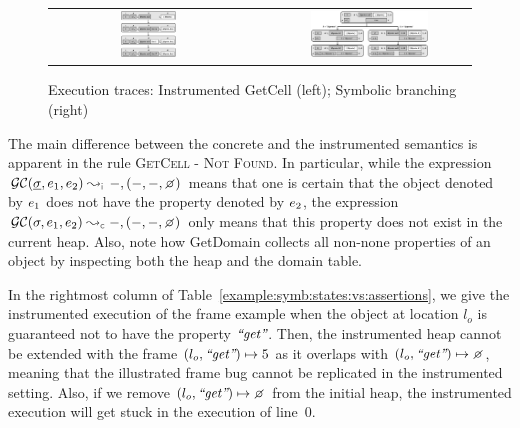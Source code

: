  
\setcounter{figure}{4}   
\begin{figure}[!t]
\centering
\begin{tabular}{c||c}
\includegraphics[width=0.28\textwidth]{figures/domaintable.png} \ & \ \includegraphics[width=0.59\textwidth]{figures/symbSemEx.png}
\end{tabular}
\vspace*{-0.3cm}
\caption{Execution traces: Instrumented GetCell (left); Symbolic branching (right)}
\label{fig:sexecexample}
\vspace*{-0.4cm}
\end{figure}

\smallskip
 The main difference between the concrete and the instrumented semantics is apparent in the rule \textsc{GetCell - Not Found}. 
In particular, while the expression $\absgetcellrule{\instrumented}{\istate, \jsilexpr_1, \jsilexpr_2}{-, (-, -, \none)}$ 
means that one is certain that the object denoted by $e_1$ does not have the property 
denoted by $e_2$, the expression $\absgetcellrule{\concrete}{\jstate, \jsilexpr_1, \jsilexpr_2}{-, (-, -, \none)}$ 
only means that this property does not exist in the current heap. Also, note how GetDomain collects all non-none properties of an object by inspecting both the heap and the domain table. %

 
 
 In the rightmost column of Table~\ref{example:symb:states:vs:assertions}, we give the instrumented 
 execution of the frame example when
 the object at location $l_o$ is guaranteed not to have the property $\text{{\it ``get''}}$. 
 Then, the  instrumented heap cannot be extended  with 
 the frame $(l_o, \text{{\it ``get''}}) \mapsto 5$ as it overlaps with $(\loc_o, \litstring{get}) \mapsto \none$, meaning 
 that the illustrated frame bug cannot be replicated in the instrumented setting.  
 Also, if we remove $(\loc_o, \litstring{get}) \mapsto \none$ from the initial heap, 
 the instrumented execution will get stuck in the execution of line~$0$. 

